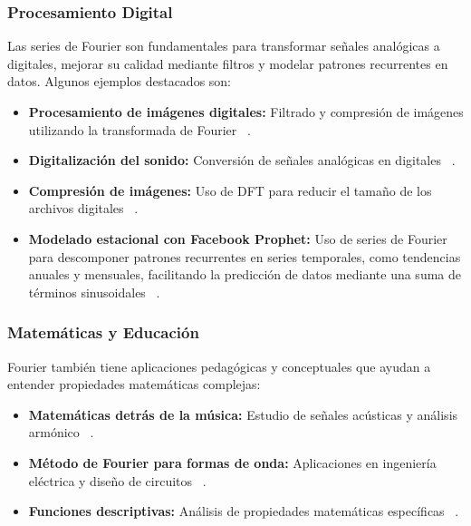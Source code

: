 \subsubsection{Procesamiento Digital}
Las series de Fourier son fundamentales para transformar señales analógicas a digitales, mejorar su calidad mediante filtros y modelar patrones recurrentes en datos. Algunos ejemplos destacados son:
\begin{itemize}
	\item \textbf{Procesamiento de imágenes digitales:} Filtrado y compresión de imágenes utilizando la transformada de Fourier ~\cite{repositorioFourierARG}. 
	\item \textbf{Digitalización del sonido:} Conversión de señales analógicas en digitales ~\cite{repositorioFourierARG}. 
	\item \textbf{Compresión de imágenes:} Uso de DFT para reducir el tamaño de los archivos digitales ~\cite{repositorioFourierARG}. 
	\item \textbf{Modelado estacional con Facebook Prophet:} Uso de series de Fourier para descomponer patrones recurrentes en series temporales, como tendencias anuales y mensuales, facilitando la predicción de datos mediante una suma de términos sinusoidales ~\cite{ProphetFacebook}. 
\end{itemize}

\subsubsection{Matemáticas y Educación}
Fourier también tiene aplicaciones pedagógicas y conceptuales que ayudan a entender propiedades matemáticas complejas:
\begin{itemize}
	\item \textbf{Matemáticas detrás de la música:} Estudio de señales acústicas y análisis armónico ~\cite{repositorioFourierARG}. 
	\item \textbf{Método de Fourier para formas de onda:} Aplicaciones en ingeniería eléctrica y diseño de circuitos ~\cite{repositorioFourierARG}. 
	\item \textbf{Funciones descriptivas:} Análisis de propiedades matemáticas específicas ~\cite{repositorioFourierARG}. 
\end{itemize}

